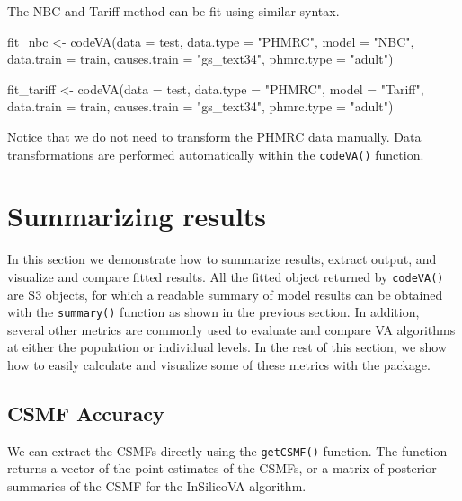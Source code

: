 The NBC and Tariff method can be fit using similar syntax.

\begin{Schunk}
\begin{Sinput}
fit_nbc <- codeVA(data = test, data.type = "PHMRC", model = "NBC", 
                   data.train = train, causes.train = "gs_text34", 
                   phmrc.type = "adult")
\end{Sinput}
\end{Schunk}

\begin{Schunk}
\begin{Sinput}
fit_tariff <- codeVA(data = test, data.type = "PHMRC", model = "Tariff",
                     data.train = train, causes.train = "gs_text34", 
                     phmrc.type = "adult")
\end{Sinput}
\end{Schunk}

Notice that we do not need to transform the PHMRC data manually. Data
transformations are performed automatically within the \texttt{codeVA()}
function.

\hypertarget{summarizing-results}{%
\section{Summarizing results}\label{summarizing-results}}

In this section we demonstrate how to summarize results, extract output,
and visualize and compare fitted results. All the fitted object returned
by \texttt{codeVA()} are S3 objects, for which a readable summary of
model results can be obtained with the \texttt{summary()} function as
shown in the previous section. In addition, several other metrics are
commonly used to evaluate and compare VA algorithms at either the
population or individual levels. In the rest of this section, we show
how to easily calculate and visualize some of these metrics with the
 package.

\hypertarget{csmf-accuracy}{%
\subsection{CSMF Accuracy}\label{csmf-accuracy}}

We can extract the CSMFs directly using the \texttt{getCSMF()} function.
The function returns a vector of the point estimates of the CSMFs, or a
matrix of posterior summaries of the CSMF for the InSilicoVA algorithm.

